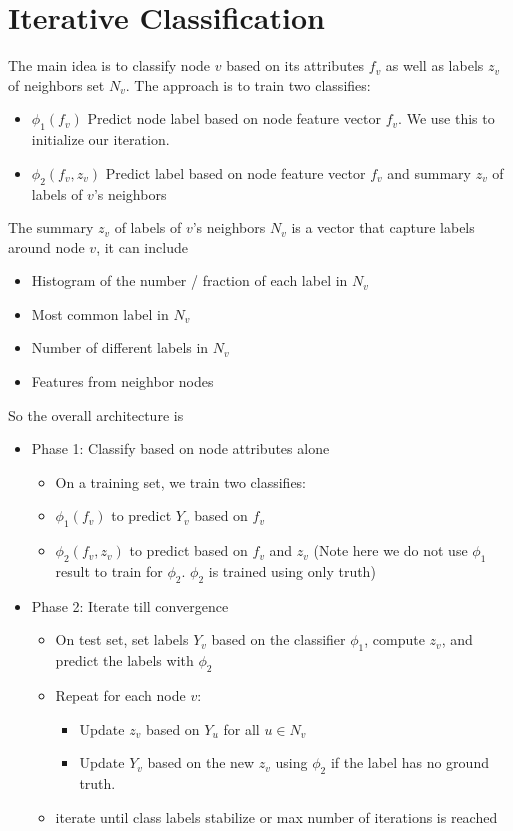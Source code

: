 \section{Iterative Classification}
The main idea is to classify node $v$ based on its attributes $f_v$ as well as labels $z_v$ of neighbors set $N_v$. The approach is to train two classifies: 
    \begin{itemize}
        \item $\phi_1(f_v)$ Predict node label based on node feature vector $f_v$. We use this to initialize our iteration. 
        \item $\phi_2(f_v, z_v)$ Predict label based on node feature vector $f_v$ and summary $z_v$ of labels of $v$'s neighbors 
    \end{itemize}

The summary $z_v$ of labels of $v$'s neighbors $N_v$ is a vector that capture labels around node $v$, it can include 
    \begin{itemize}
        \item Histogram of the number / fraction of each label in $N_v$
        \item Most common label in $N_v$
        \item Number of different labels in $N_v$
        \item Features from neighbor nodes 
    \end{itemize}
So the overall architecture is 
    \begin{itemize}
        \item Phase 1: Classify based on node attributes alone 
            \begin{itemize}
                \item On a training set, we train two classifies: 
                \item $\phi_1(f_v)$ to predict $Y_v$ based on $f_v$
                \item $\phi_2(f_v, z_v)$ to predict based on $f_v$ and $z_v$ (Note here we do not use $\phi_1$ result to train for $\phi_2$. $\phi_2$ is trained using only truth)
            \end{itemize}
        \item Phase 2: Iterate till convergence 
            \begin{itemize}
                \item On test set, set labels $Y_v$ based on the classifier $\phi_1$, compute $z_v$, and predict the labels with $\phi_2$
                \item Repeat for each node $v$: 
                    \begin{itemize}
                        \item Update $z_v$ based on $Y_u$ for all $u\in N_v$
                        \item Update $Y_v$ based on the new $z_v$ using $\phi_2$ if the label has no ground truth. 
                    \end{itemize}
                \item iterate until class labels stabilize or max number of iterations is reached
            \end{itemize}
    \end{itemize}
